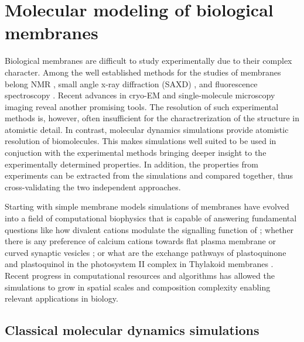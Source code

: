 \chapter{Molecular modeling of biological membranes}
\label{chap:methods}

Biological membranes are difficult to study experimentally due to their complex character. 
Among the well established methods for the studies of membranes belong
 NMR                                 \citep{catte16, botan15, seelig80, seelig90, seelig87}, 
small angle x-ray diffraction (SAXD) \citep{ollila16, pabst07}, 
and fluorescence spectroscopy        \citep{javanainen17, melcrova16, vacha09a}. 
Recent advances in cryo-EM             \citep{chiu2017editorial, nogales2015development}
and single-molecule microscopy imaging \citep{ritchie2013single}
reveal another promising tools. 
The resolution of such experimental methods is, however, often insufficient 
for the charactrerization of the structure in atomistic detail. 
In contrast, molecular dynamics simulations provide atomistic resolution of biomolecules.
This makes simulations well suited to be used in conjuction with the experimental methods
bringing deeper insight to the experimentally determined properties. 
In addition, the properties from experiments can be extracted from the simulations 
and compared together, thus cross-validating the two independent approaches. 

Starting with simple membrane models \citep{Berger97, bockmann04, bockmann03, sachs04, sachs04_potential} 
simulations of membranes have evolved into a field of computational biophysics
that is capable of answering fundamental questions like
how divalent cations modulate the signalling function of  \citep{Bilkova2017Calcium}; 
whether there is any preference of calcium cations towards flat plasma membrane or curved synaptic vesicles \citep{magarkar2017};
or what are the exchange pathways of plastoquinone and plastoquinol in the photosystem II complex in Thylakoid membranes \citep{eerden17}. 
Recent progress in computational resources and algorithms
has allowed the simulations to grow in spatial scales and composition complexity 
enabling relevant applications in biology. \citep{perspective_cecam_lugano_2018} 


\section{Classical molecular dynamics simulations}
\label{section:md}

